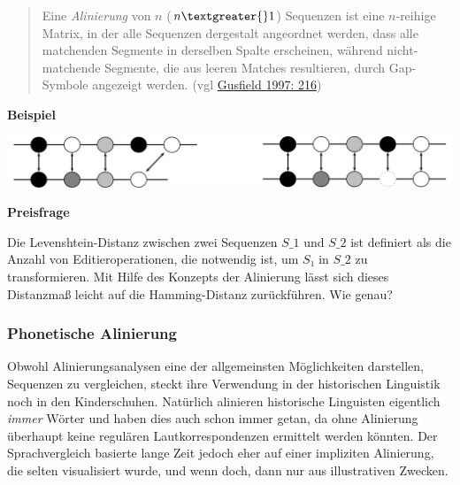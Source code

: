 \begin{quote}
Eine \emph{Alinierung} von $n$ ($n\textgreater{}1$) Sequenzen ist
eine $n$-reihige Matrix, in der alle Sequenzen dergestalt angeordnet
werden, dass alle matchenden Segmente in derselben Spalte erscheinen,
während nicht-matchende Segmente, die aus leeren Matches resultieren,
durch Gap-Symbole angezeigt werden. (vgl
\href{http://bibliography.lingpy.org?key=Gusfield1997}{Gusfield 1997:
216})
\end{quote}



\vspace{0.5cm}\par\noindent\textbf{Beispiel}\vspace{0.5cm}

\includegraphics[width=\textwidth]{img/alignment.pdf}



\vspace{0.5cm}\par\noindent\textbf{Preisfrage}\vspace{0.5cm}

Die Levenshtein-Distanz zwischen zwei Sequenzen $S\_1$ und $S\_2$
ist definiert als die Anzahl von Editieroperationen, die notwendig ist,
um $S₁$ in $S\_2$ zu transformieren. Mit Hilfe des Konzepts der
Alinierung lässt sich dieses Distanzmaß leicht auf die Hamming-Distanz
zurückführen. Wie genau?


\subsubsection{\texorpdfstring{{Phonetische
Alinierung}}{Phonetische Alinierung}}

Obwohl Alinierungsanalysen eine der allgemeinsten Möglichkeiten
darstellen, Sequenzen zu vergleichen, steckt ihre Verwendung in der
historischen Linguistik noch in den Kinderschuhen. Natürlich alinieren
historische Linguisten eigentlich \emph{immer} Wörter und haben dies
auch schon immer getan, da ohne Alinierung überhaupt keine regulären
Lautkorrespondenzen ermittelt werden könnten. Der Sprachvergleich
basierte lange Zeit jedoch eher auf einer impliziten Alinierung, die
selten visualisiert wurde, und wenn doch, dann nur aus illustrativen
Zwecken.



